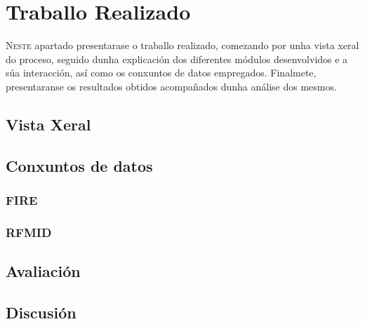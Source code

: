 \chapter{Traballo Realizado}
\label{chap:Traballo Realizado}

\lettrine{N}{este} apartado presentarase o traballo realizado, comezando por unha vista xeral do proceso, 
seguido dunha explicación dos diferentes módulos desenvolvidos e a súa interacción, así como os conxuntos de datos empregados.
Finalmete, presentaranse os resultados obtidos acompañados dunha análise dos mesmos.
\section{Vista Xeral}
\label{sec:VistaXeral}


\section{Conxuntos de datos}
\label{sec:Conxuntos de datos}

\subsection{FIRE}
\label{subsec:FIRE}

\subsection{RFMID}
\label{subsec:RFMID}

\section{Avaliación}
\label{sec:Avaliación}

\section{Discusión}
\label{sec:Discusión}